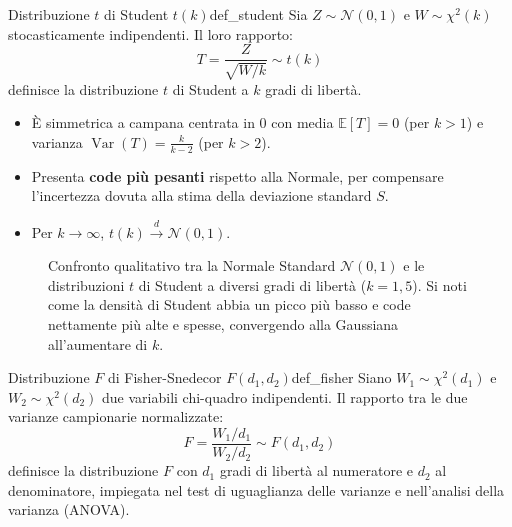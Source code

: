 \begin{definizione}{Distribuzione $t$ di Student $t(k)$}{def_student}
Sia $Z \sim \mathcal{N}(0, 1)$ e $W \sim \chi^2(k)$ stocasticamente indipendenti. Il loro rapporto:
\begin{equation}
    T = \frac{Z}{\sqrt{W / k}} \sim t(k)
\end{equation}
definisce la distribuzione $t$ di Student a $k$ gradi di libertà.
\begin{itemize}
    \item È simmetrica a campana centrata in 0 con media $\mathbb{E}[T] = 0$ (per $k > 1$) e varianza $\operatorname{Var}(T) = \frac{k}{k-2}$ (per $k > 2$).
    \item Presenta \textbf{code più pesanti} rispetto alla Normale, per compensare l'incertezza dovuta alla stima della deviazione standard $S$.
    \item Per $k \to \infty$, $t(k) \xrightarrow{d} \mathcal{N}(0, 1)$.
\end{itemize}
\end{definizione}

\begin{figure}[htbp]
    \centering
    
    \caption{Confronto qualitativo tra la Normale Standard $\mathcal{N}(0,1)$ e le distribuzioni $t$ di Student a diversi gradi di libertà ($k=1, 5$). Si noti come la densità di Student abbia un picco più basso e code nettamente più alte e spesse, convergendo alla Gaussiana all'aumentare di $k$.}
    \label{fig:confronto_student_gaussiana}
\end{figure}

\begin{definizione}{Distribuzione $F$ di Fisher-Snedecor $F(d_1, d_2)$}{def_fisher}
Siano $W_1 \sim \chi^2(d_1)$ e $W_2 \sim \chi^2(d_2)$ due variabili chi-quadro indipendenti. Il rapporto tra le due varianze campionarie normalizzate:
\begin{equation}
    F = \frac{W_1 / d_1}{W_2 / d_2} \sim F(d_1, d_2)
\end{equation}
definisce la distribuzione $F$ con $d_1$ gradi di libertà al numeratore e $d_2$ al denominatore, impiegata nel test di uguaglianza delle varianze e nell'analisi della varianza (ANOVA).
\end{definizione}

